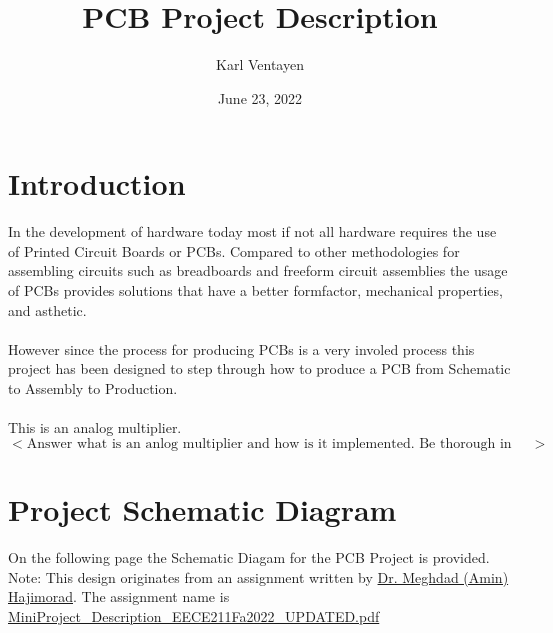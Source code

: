 \documentclass[12pt, letterpaper]{article}
\title{PCB Project Description}
\author{Karl Ventayen}
\date{June 23, 2022}
\begin{document}
\begin{comment}
\begin{titlepage}
    \maketitle
\end{titlepage}
\end{comment}

\maketitle

\tableofcontents{}

\section{Introduction}
In the development of hardware today most if not all hardware requires the use of Printed Circuit Boards or PCBs. Compared to other methodologies for assembling circuits such as breadboards and freeform circuit assemblies the usage of PCBs provides solutions that have a better formfactor, mechanical properties, and asthetic.\\
\\
However since the process for producing PCBs is a very involed process this project has been designed to step through how to produce a PCB from Schematic to Assembly to Production.
\\
\\
This is an analog multiplier. $<\text{Answer what is an anlog multiplier and how is it implemented. Be thorough in the discription for the project.}>$

\section{Project Schematic Diagram}
On the following page the Schematic Diagam for the PCB Project is provided.\\
Note: This design originates from an assignment written by \href{https://www.csuchico.edu/eece/faculty-staff/faculty/meghdad-hajimorad.shtml}{Dr. Meghdad (Amin) Hajimorad}. The assignment name is \href{run:./assets/MiniProject_Description_EECE211Fa2022_UPDATED.pdf}{MiniProject\_Description\_EECE211Fa2022\_UPDATED.pdf}\\


\end{document}
